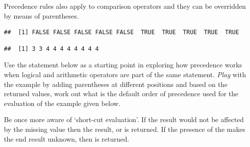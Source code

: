 \documentclass[krantz2]{krantz}\usepackage{knitr}%
\begin{document}
Precedence rules also apply to comparison operators and they can be overridden by means of parentheses.

\begin{knitrout}\footnotesize
{}\color{fgcolor}\begin{kframe}
\begin{alltt}
 \hlopt{>}  \hlopt{+} 
\end{alltt}
\begin{verbatim}
##  [1] FALSE FALSE FALSE FALSE FALSE  TRUE  TRUE  TRUE  TRUE  TRUE
\end{verbatim}
\begin{alltt}
 \hlopt{>} \hlstd{)} \hlopt{+} 
\end{alltt}
\begin{verbatim}
##  [1] 3 3 4 4 4 4 4 4 4 4
\end{verbatim}
\end{kframe}
\end{knitrout}

\begin{playground}
Use the statement below as a starting point in exploring how precedence works when logical and arithmetic operators are part of the same statement. \emph{Play} with the example by adding parentheses at different positions and based on the returned values, work out what is the default order of precedence used for the evaluation of the example given below.
\begin{knitrout}\footnotesize
{}\color{fgcolor}\begin{kframe}
\begin{alltt}
 \hlkwb{<-} \hlopt{:}
 \hlopt{>}  \hlopt{|}  \hlopt{+}  \hlopt{<} 
\end{alltt}
\end{kframe}
\end{knitrout}
\end{playground}

Be once more aware of `short-cut evaluation'. If the result would not be affected by the missing value then the result,  or  is returned. If the presence of the  makes the end result unknown, then  is returned.
\end{document}
